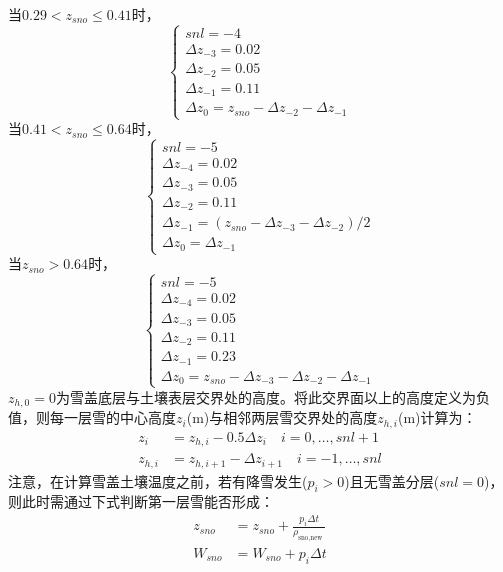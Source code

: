 当$0.29<z_{sno}\le0.41$时，
\begin{equation}
\left\{\begin{array}{c}s n l=-4 \\ \Delta z_{-3}=0.02 \\ \Delta z_{-2}=0.05 \\ \Delta z_{-1}=0.11 \\ \Delta z_{0}=z_{sno}-\Delta z_{-2}-\Delta z_{-1}\end{array}\right.
\end{equation}
当$0.41<z_{sno}\le0.64$时，
\begin{equation}
\left\{\begin{array}{c}s n l=-5 \\ \Delta z_{-4}=0.02 \\ \Delta z_{-3}=0.05 \\ \Delta z_{-2}=0.11 \\ \Delta z_{-1}=\left(z_{sno}-\Delta z_{-3}-\Delta z_{-2}\right) / 2 \\ \Delta z_{0}=\Delta z_{-1}\end{array}\right.
\end{equation}
当$z_{sno}>0.64$时，
\begin{equation}
\left\{\begin{array}{c}s n l=-5 \\ \Delta z_{-4}=0.02 \\ \Delta z_{-3}=0.05 \\ \Delta z_{-2}=0.11 \\ \Delta z_{-1}=0.23 \\ \Delta z_{0}=z_{sno}-\Delta z_{-3}-\Delta z_{-2}-\Delta z_{-1}\end{array}\right.
\end{equation}
$z_{h,0}=0$为雪盖底层与土壤表层交界处的高度。将此交界面以上的高度定义为负值，则每一层雪的中心高度$z_i$(m)与相邻两层雪交界处的高度$z_{h,i}$(m)计算为：
\begin{equation}
\begin{aligned}
z_{i} &= z_{h, i}-0.5 \Delta z_{i} \quad i=0, \ldots, snl+1 \\ 
z_{h, i} &= z_{h, i+1}-\Delta z_{i+1}  \quad i=-1, \ldots, snl
\end{aligned}
\end{equation}
注意，在计算雪盖土壤温度之前，若有降雪发生($p_i>0$)且无雪盖分层($snl=0$)，则此时需通过下式判断第一层雪能否形成：
\begin{equation}
\begin{aligned}
z_{sno} &= z_{sno}+\frac{p_{i} \Delta t}{\rho_{\text {sno,new }}} \\ 
W_{sno} &= W_{sno}+p_{i} \Delta t
\end{aligned}
\end{equation}
